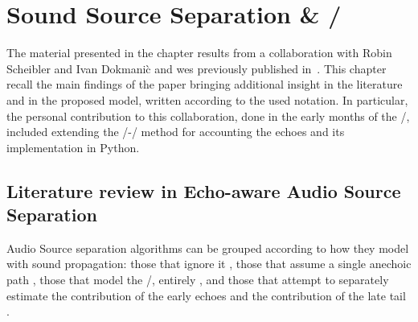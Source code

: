 \chapter{Sound Source Separation \& \SEPARAKEdef/}\label{chap:separake}

 \synopsisChSeparake

\mynewline
The material presented in the chapter results from a collaboration with Robin Scheibler and Ivan Dokmani\`{c} and wes previously published in~\cite{scheibler2018separake}.
This chapter recall the main findings of the paper bringing additional insight in the literature and in the proposed model, written according to the used notation.
In particular, the personal contribution to this collaboration, done in the early months of the \PhD/, included extending the \EMdef/-\NMF/ method for accounting the echoes and its implementation in Python.

\section{Literature review in Echo-aware Audio Source Separation}
Audio Source separation algorithms can be grouped according to how they model with sound propagation:
those that ignore it ,
those that assume a single anechoic path ,
those that model the \RTFs/, entirely ,
and those that attempt to separately estimate the contribution of the early echoes and the contribution of the late tail .

